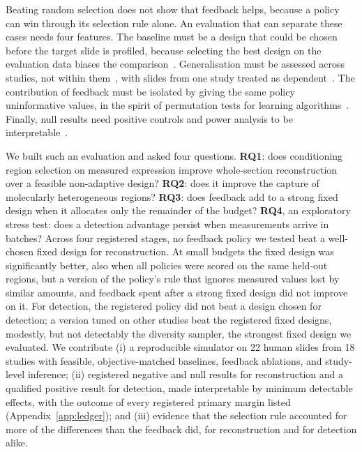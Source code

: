 \documentclass[10pt]{article}
\begin{document}
Beating random selection does not show that feedback helps, because a policy can win through its selection rule
alone. An evaluation that can separate these cases needs four features. The baseline must be a design that could be
chosen before the target slide is profiled, because selecting the best design on the evaluation data biases the
comparison~\citep{varma2006bias,cawley2010over}. Generalisation must be assessed across studies, not within
them~\citep{bernau2014cross}, with slides from one study treated as dependent~\citep{field2007bootstrapping}. The
contribution of feedback must be isolated by giving the same policy uninformative values, in the spirit of
permutation tests for learning algorithms~\citep{ojala2010permutation}. Finally, null results need positive
controls and power analysis to be interpretable~\citep{altman1995absence}.

We built such an evaluation and asked four questions. \textbf{RQ1}: does conditioning region selection on
measured expression improve whole-section reconstruction over a feasible non-adaptive design? \textbf{RQ2}: does
it improve the capture of molecularly heterogeneous regions? \textbf{RQ3}: does feedback add to a strong fixed
design when it allocates only the remainder of the budget? \textbf{RQ4}, an exploratory stress test: does a
detection advantage persist when measurements arrive in batches? Across four registered stages, no feedback policy
we tested beat a well-chosen fixed design for reconstruction. At small budgets the fixed design was significantly
better, also when all policies were scored on the same held-out regions, but a version of the policy's rule that
ignores measured values lost by similar amounts, and feedback spent after a strong fixed design did not improve on
it. For detection, the registered policy did not beat a design chosen for detection; a version tuned on other
studies beat the registered fixed designs, modestly, but not detectably the diversity sampler, the strongest fixed
design we evaluated. We contribute (i) a reproducible simulator on 22 human slides from 18 studies with feasible,
objective-matched baselines, feedback ablations, and study-level inference; (ii) registered negative and null
results for reconstruction and a qualified positive result for detection, made interpretable by minimum detectable
effects, with the outcome of every registered primary margin listed (Appendix~\ref{app:ledger}); and (iii) evidence
that the selection rule accounted for more of the differences than the feedback did, for reconstruction and for
detection alike.
\end{document}
